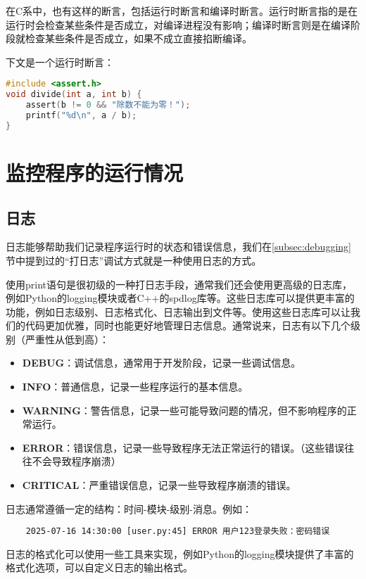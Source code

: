 \documentclass[../main.tex]{subfiles}
\begin{document}
在C系中，也有这样的断言，包括运行时断言和编译时断言。运行时断言指的是在运行时会检查某些条件是否成立，对编译进程没有影响；编译时断言则是在编译阶段就检查某些条件是否成立，如果不成立直接掐断编译。

下文是一个运行时断言：
\begin{lstlisting}[language=C]
#include <assert.h>
void divide(int a, int b) {
    assert(b != 0 && "除数不能为零！");
    printf("%d\n", a / b);
}
\end{lstlisting}

\section{监控程序的运行情况}\label{sec:monitoring}

\subsection{日志}\label{subsec:logging}

日志能够帮助我们记录程序运行时的状态和错误信息，我们在\ref{subsec:debugging}节中提到过的“打日志”调试方式就是一种使用日志的方式。

使用print语句是很初级的一种打日志手段，通常我们还会使用更高级的日志库，例如Python的logging模块或者C++的spdlog库等。这些日志库可以提供更丰富的功能，例如日志级别、日志格式化、日志输出到文件等。使用这些日志库可以让我们的代码更加优雅，同时也能更好地管理日志信息。通常说来，日志有以下几个级别（严重性从低到高）：
\begin{itemize}
  \item \textbf{DEBUG}：调试信息，通常用于开发阶段，记录一些调试信息。
  \item \textbf{INFO}：普通信息，记录一些程序运行的基本信息。
  \item \textbf{WARNING}：警告信息，记录一些可能导致问题的情况，但不影响程序的正常运行。
  \item \textbf{ERROR}：错误信息，记录一些导致程序无法正常运行的错误。（这些错误往往不会导致程序崩溃）
  \item \textbf{CRITICAL}：严重错误信息，记录一些导致程序崩溃的错误。
\end{itemize}

日志通常遵循一定的结构：时间-模块-级别-消息。例如：
\begin{lstlisting}
    2025-07-16 14:30:00 [user.py:45] ERROR 用户123登录失败：密码错误
\end{lstlisting}

日志的格式化可以使用一些工具来实现，例如Python的logging模块提供了丰富的格式化选项，可以自定义日志的输出格式。
\end{document}
